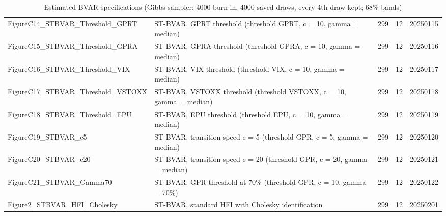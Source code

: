 \begin{table}[ht]
\begin{tabular}{lp{6cm}rrr}
  FigureC14\_STBVAR\_Threshold\_GPRT & ST-BVAR, GPRT threshold (threshold GPRT, c = 10, gamma = median) & 299 & 12 & 20250115 \\ 
  FigureC15\_STBVAR\_Threshold\_GPRA & ST-BVAR, GPRA threshold (threshold GPRA, c = 10, gamma = median) & 299 & 12 & 20250116 \\ 
  FigureC16\_STBVAR\_Threshold\_VIX & ST-BVAR, VIX threshold (threshold VIX, c = 10, gamma = median) & 299 & 12 & 20250117 \\ 
  FigureC17\_STBVAR\_Threshold\_VSTOXX & ST-BVAR, VSTOXX threshold (threshold VSTOXX, c = 10, gamma = median) & 299 & 12 & 20250118 \\ 
  FigureC18\_STBVAR\_Threshold\_EPU & ST-BVAR, EPU threshold (threshold EPU, c = 10, gamma = median) & 299 & 12 & 20250119 \\ 
  FigureC19\_STBVAR\_c5 & ST-BVAR, transition speed c = 5 (threshold GPR, c = 5, gamma = median) & 299 & 12 & 20250120 \\ 
  FigureC20\_STBVAR\_c20 & ST-BVAR, transition speed c = 20 (threshold GPR, c = 20, gamma = median) & 299 & 12 & 20250121 \\ 
  FigureC21\_STBVAR\_Gamma70 & ST-BVAR, GPR threshold at 70\% (threshold GPR, c = 10, gamma = 70\%) & 299 & 12 & 20250122 \\ 
  Figure2\_STBVAR\_HFI\_Cholesky & ST-BVAR, standard HFI with Cholesky identification & 299 & 12 & 20250201 \\ 
   \hline
\end{tabular}
\endgroup
\caption{Estimated BVAR specifications (Gibbs sampler: 4000 burn-in, 4000 saved draws, every 4th draw kept; 68\% bands)} 
\label{tab:var_models}
\end{table}
